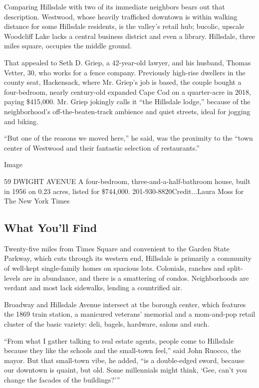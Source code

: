 Comparing Hillsdale with two of its immediate neighbors bears out that
description. Westwood, whose heavily trafficked downtown is within
walking distance for some Hillsdale residents, is the valley's retail
hub; bucolic, upscale Woodcliff Lake lacks a central business district
and even a library. Hillsdale, three miles square, occupies the middle
ground.

That appealed to Seth D. Griep, a 42-year-old lawyer, and his husband,
Thomas Vetter, 30, who works for a fence company. Previously high-rise
dwellers in the county seat, Hackensack, where Mr. Griep's job is based,
the couple bought a four-bedroom, nearly century-old expanded Cape Cod
on a quarter-acre in 2018, paying \$415,000. Mr. Griep jokingly calls it
``the Hillsdale lodge,'' because of the neighborhood's
off-the-beaten-track ambience and quiet streets, ideal for jogging and
biking.

``But one of the reasons we moved here,'' he said, was the proximity to
the ``town center of Westwood and their fantastic selection of
restaurants.''

Image

59 DWIGHT AVENUE \textbar{} A four-bedroom, three-and-a-half-bathroom
house, built in 1956 on 0.23 acres, listed for \$744,000.
201-930-8820Credit...Laura Moss for The New York Times

\hypertarget{what-youll-find}{%
\subsection{What You'll Find}\label{what-youll-find}}

Twenty-five miles from Times Square and convenient to the Garden State
Parkway, which cuts through its western end, Hillsdale is primarily a
community of well-kept single-family homes on spacious lots. Colonials,
ranches and split-levels are in abundance, and there is a smattering of
condos. Neighborhoods are verdant and most lack sidewalks, lending a
countrified air.

Broadway and Hillsdale Avenue intersect at the borough center, which
features the 1869 train station, a manicured veterans' memorial and a
mom-and-pop retail cluster of the basic variety: deli, bagels, hardware,
salons and such.

``From what I gather talking to real estate agents, people come to
Hillsdale because they like the schools and the small-town feel,'' said
John Ruocco, the mayor. But that small-town vibe, he added, ``is a
double-edged sword, because our downtown is quaint, but old. Some
millennials might think, `Gee, can't you change the facades of the
buildings?'''

